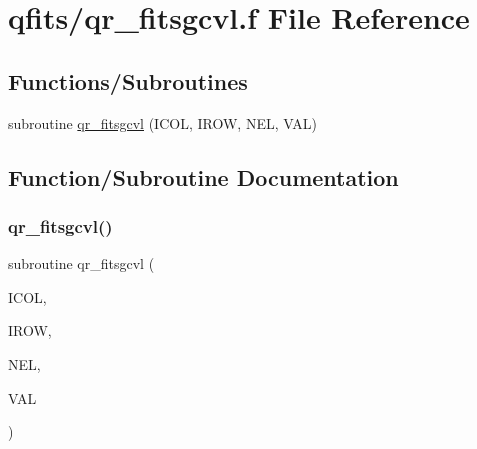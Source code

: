 \hypertarget{qr__fitsgcvl_8f}{}\section{qfits/qr\+\_\+fitsgcvl.f File Reference}
\label{qr__fitsgcvl_8f}
\subsection*{Functions/\+Subroutines}
\begin{DoxyCompactItemize}
\item 
subroutine \hyperlink{qr__fitsgcvl_8f_aa49ed287115a28a2783d664705c4f5a9}{qr\+\_\+fitsgcvl} (I\+C\+OL, I\+R\+OW, N\+EL, V\+AL)
\end{DoxyCompactItemize}


\subsection{Function/\+Subroutine Documentation}
\mbox{\label{qr__fitsgcvl_8f_aa49ed287115a28a2783d664705c4f5a9}} 
\subsubsection{\texorpdfstring{qr\+\_\+fitsgcvl()}{qr\_fitsgcvl()}}
{\footnotesize\ttfamily subroutine qr\+\_\+fitsgcvl (\begin{DoxyParamCaption}\item[{integer}]{I\+C\+OL,  }\item[{integer}]{I\+R\+OW,  }\item[{integer}]{N\+EL,  }\item[{logical, dimension(nel)}]{V\+AL }\end{DoxyParamCaption})}

